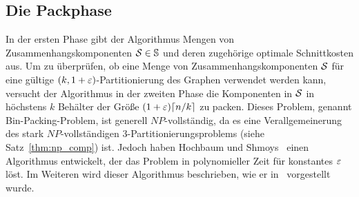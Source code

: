 \subsection{Die Packphase}\label{sec:packing}
In der ersten Phase gibt der Algorithmus Mengen von Zusammenhangskomponenten $\mathcal{S} \in \mathbb{S}$ und deren zugehörige optimale Schnittkosten aus.
Um zu überprüfen, ob eine Menge von Zusammenhangskomponenten $\mathcal{S}$ für eine gültige $(k,1+\varepsilon)$\hyp Partitionierung des Graphen verwendet werden kann, versucht der Algorithmus in der zweiten Phase die Komponenten in $\mathcal{S}$ in höchstens $k$ Behälter der Größe $(1 + \eps) \ceil*{n/k}$ zu packen.
Dieses Problem, genannt Bin-Packing-Problem, ist generell $NP$\hyp vollständig, da es eine Verallgemeinerung des stark $NP$\hyp vollständigen 3\hyp Partitionierungsproblems (siehe Satz~\ref{thm:np_comp}) ist.
Jedoch haben Hochbaum und Shmoys~\parencite{hs86} einen Algorithmus entwickelt, der das Problem in polynomieller Zeit für konstantes $\varepsilon$ löst.
Im Weiteren wird dieser Algorithmus beschrieben, wie er in~\parencite{hs86,va13} vorgestellt wurde.

